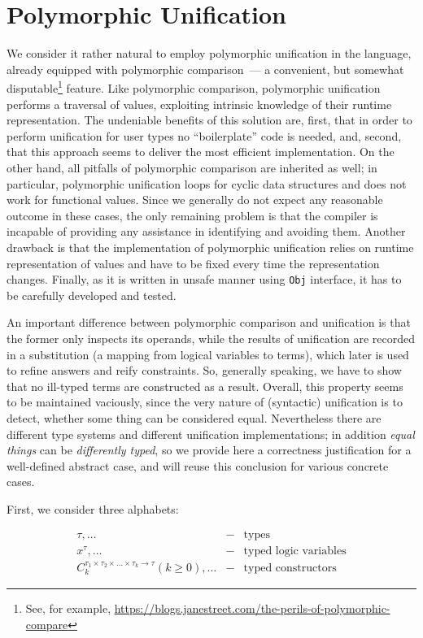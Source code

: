 \section{Polymorphic Unification}
\label{polyuni}

We consider it rather natural to employ polymorphic unification in the language, already equipped 
with polymorphic comparison~--- a convenient, but somewhat disputable\footnote{See, for example, 
\url{https://blogs.janestreet.com/the-perils-of-polymorphic-compare}} feature. Like polymorphic comparison, 
polymorphic unification performs a traversal of values, exploiting intrinsic knowledge of their runtime 
representation. The undeniable benefits of this solution are, first, that in order to perform unification 
for user types no ``boilerplate'' code is needed, and, second, that this approach seems to deliver the
most efficient implementation. On the other hand, all pitfalls of polymorphic comparison are inherited as 
well; in particular, polymorphic unification loops for cyclic data structures and does not work for functional 
values. Since we generally do not expect any reasonable outcome in these cases, the only remaining problem is that
the compiler is incapable of providing any assistance in identifying and avoiding them. Another drawback is that 
the implementation of polymorphic unification relies on runtime representation of values and have to be fixed 
every time the representation changes.  Finally, as it is written in unsafe manner using \lstinline{Obj} interface, 
it has to be carefully developed and tested.

An important difference between polymorphic comparison and unification is that the former only inspects its operands, 
while the results of unification are recorded in a substitution (a mapping from logical variables to terms), which 
later is used to refine answers and reify  constraints. So, generally speaking, we have to show that no ill-typed 
terms are constructed as a result. Overall, this property seems to be maintained vaciously, since the very 
nature of (syntactic) unification is to detect, whether some thing can be considered equal. Nevertheless there are
different type systems and different unification implementations; in addition \emph{equal things} can be
\emph{differently typed}, so we provide here a correctness justification for a well-defined abstract case, and will 
reuse this conclusion for various concrete cases.

First, we consider three alphabets:

$$
\begin{array}{rcl}
  \tau,\dots&-&\mbox{types}\\
  x^\tau,\dots&-&\mbox{typed logic variables}\\
  C_k^{\tau_1\times\tau_2\times\dots\times\tau_k\to\tau} (k\ge 0),\dots&-&\mbox{typed constructors}
\end{array}
$$

